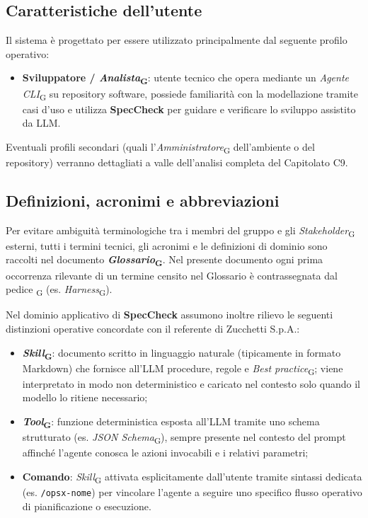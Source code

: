 \documentclass[11pt, a4paper]{article}
\newcommand{\glossario}[1]{\textit{#1}\textsubscript{G}}
\begin{document}
\subsection{Caratteristiche dell'utente}
Il sistema è progettato per essere utilizzato principalmente dal seguente profilo operativo:
\begin{itemize}
    \item \textbf{Sviluppatore / \glossario{Analista}}: utente tecnico che opera mediante un \glossario{Agente CLI} su repository software, possiede familiarità con la modellazione tramite casi d'uso e utilizza \textbf{SpecCheck} per guidare e verificare lo sviluppo assistito da LLM.
\end{itemize}
Eventuali profili secondari (quali l'\glossario{Amministratore} dell'ambiente o del repository) verranno dettagliati a valle dell'analisi completa del Capitolato C9.

\subsection{Definizioni, acronimi e abbreviazioni}
Per evitare ambiguità terminologiche tra i membri del gruppo e gli \glossario{Stakeholder} esterni, tutti i termini tecnici, gli acronimi e le definizioni di dominio sono raccolti nel documento \textbf{\glossario{Glossario}}. Nel presente documento ogni prima occorrenza rilevante di un termine censito nel Glossario è contrassegnata dal pedice \textsubscript{G} (es. \glossario{Harness}).

Nel dominio applicativo di \textbf{SpecCheck} assumono inoltre rilievo le seguenti distinzioni operative concordate con il referente di Zucchetti S.p.A.:
\begin{itemize}
    \item \textbf{\glossario{Skill}}: documento scritto in linguaggio naturale (tipicamente in formato Markdown) che fornisce all'LLM procedure, regole e \glossario{Best practice}; viene interpretato in modo non deterministico e caricato nel contesto solo quando il modello lo ritiene necessario;
    \item \textbf{\glossario{Tool}}: funzione deterministica esposta all'LLM tramite uno schema strutturato (es. \glossario{JSON Schema}), sempre presente nel contesto del prompt affinché l'agente conosca le azioni invocabili e i relativi parametri;
    \item \textbf{Comando}: \glossario{Skill} attivata esplicitamente dall'utente tramite sintassi dedicata (es. \texttt{/opsx-nome}) per vincolare l'agente a seguire uno specifico flusso operativo di pianificazione o esecuzione.
\end{itemize}
\end{document}
